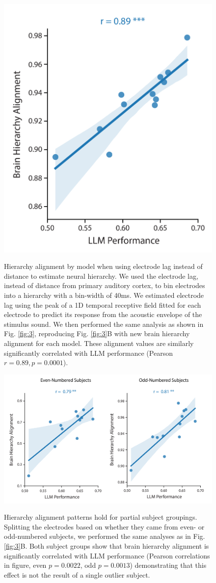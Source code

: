 \begin{figure}[ht]
  \centering
  {\includegraphics[width=0.45\linewidth]{supplementary_figures/Figure_supplemental_hierarchy_vs_performance_LAGTRF1D-01.png}}
  \caption{Hierarchy alignment by model when using electrode lag instead of distance to estimate neural hierarchy. We used the electrode lag, instead of distance from primary auditory cortex, to bin electrodes into a hierarchy with a bin-width of 40ms. We estimated electrode lag using the peak of a 1D temporal receptive field fitted for each electrode to predict its response from the acoustic envelope of the stimulus sound. We then performed the same analysis as shown in Fig. \protect\ref{fig:3}, reproducing Fig. \protect\ref{fig:3}B with new brain hierarchy alignment for each model. These alignment values are similarly significantly correlated with LLM performance (Pearson $r=0.89, p=0.0001$).}
  \label{fig:s3}
\end{figure}

\begin{figure}[ht]
  \centering
  {\includegraphics[width=0.95\linewidth]{supplementary_figures/Figure_supplemental_hierarchy_vs_performance_DISTANCE_Even-and-Odd-01.png}}
  \caption{Hierarchy alignment patterns hold for partial subject groupings. Splitting the electrodes based on whether they came from even- or odd-numbered subjects, we performed the same analyses as in Fig. \protect\ref{fig:3}B. Both subject groups show that brain hierarchy alignment is significantly correlated with LLM performance (Pearson correlations in figure, even $p=0.0022$, odd $p=0.0013$) demonstrating that this effect is not the result of a single outlier subject.}
  \label{fig:s4}
\end{figure}